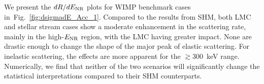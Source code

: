 \documentclass[11pt,a4paper]{article}
\newcommand{\TODO}[1]{\textcolor{red}{[TODO: #1]}}
\begin{document}
We present the $dR/dE_{\rm NR}$ plots for WIMP benchmark cases in~Fig.~\ref{fig:dsigmadE_Acc_1}. Compared to the results from SHM, both LMC and stellar stream cases show a moderate enhancement in the scattering rate, mainly in the high-$E_{\rm NR}$ region, with the LMC having greater impact. None are drastic enough to change the shape of the major peak of elastic scattering. For inelastic scattering, the effects are more apparent for the $\gtrsim 300$~keV range. Numerically, we find that neither of the two scenarios will significantly change the statistical interpretations compared to their SHM counterparts. %
\end{document}
